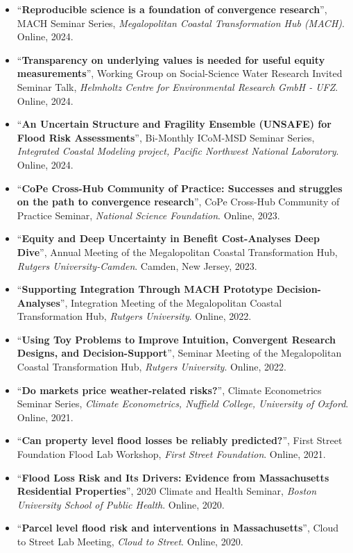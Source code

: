 \documentclass[10pt,oneside]{article}
\begin{document}
\begin{itemize}[label={}]
  \item \enquote{\textbf{Reproducible science is a foundation of convergence research}}, MACH Seminar Series,  \textit{Megalopolitan Coastal Transformation Hub (MACH)}. Online, 2024.
  
  \item \enquote{\textbf{Transparency on underlying values is needed for useful equity measurements}}, Working Group on Social-Science Water Research Invited Seminar Talk,  \textit{Helmholtz Centre for Environmental Research GmbH - UFZ}. Online, 2024.
  
  \item \enquote{\textbf{An Uncertain Structure and Fragility Ensemble (UNSAFE) for Flood Risk Assessments}}, Bi-Monthly ICoM-MSD Seminar Series,  \textit{Integrated Coastal Modeling project, Pacific Northwest National Laboratory}. Online, 2024.
  
  \item \enquote{\textbf{CoPe Cross-Hub Community of Practice: Successes and struggles on the path to convergence research}}, CoPe Cross-Hub Community of Practice Seminar,  \textit{National Science Foundation}. Online, 2023.
  
  \item \enquote{\textbf{Equity and Deep Uncertainty in Benefit Cost-Analyses Deep Dive}}, Annual Meeting of the Megalopolitan Coastal Transformation Hub,  \textit{Rutgers University-Camden}. Camden, New Jersey, 2023.
  
  \item \enquote{\textbf{Supporting Integration Through MACH Prototype Decision-Analyses}}, Integration Meeting of the Megalopolitan Coastal Transformation Hub,  \textit{Rutgers University}. Online, 2022.
  
  \item \enquote{\textbf{Using Toy Problems to Improve Intuition, Convergent Research Designs, and Decision-Support}}, Seminar Meeting of the Megalopolitan Coastal Transformation Hub,  \textit{Rutgers University}. Online, 2022.
  
  \item \enquote{\textbf{Do markets price weather-related risks?}}, Climate Econometrics Seminar Series,  \textit{Climate Econometrics, Nuffield College, University of Oxford}. Online, 2021.
  
  \item \enquote{\textbf{Can property level flood losses be reliably predicted?}}, First Street Foundation Flood Lab Workshop,  \textit{First Street Foundation}. Online, 2021.
  
  \item \enquote{\textbf{Flood Loss Risk and Its Drivers: Evidence from Massachusetts Residential Properties}}, 2020 Climate and Health Seminar,  \textit{Boston University School of Public Health}. Online, 2020.
  
  \item \enquote{\textbf{Parcel level flood risk and interventions in Massachusetts}}, Cloud to Street Lab Meeting,  \textit{Cloud to Street}. Online, 2020.
  
\end{itemize}
\end{document}
